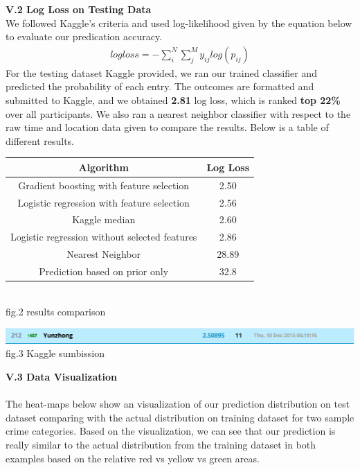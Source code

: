 \documentclass[12pt]{article}
\newenvironment{p4}[2][Part V Results and Evaluation]{\begin{trivlist}
\item[\hskip \labelsep {\bfseries #1}\hskip \labelsep {\bfseries #2}]}{\end{trivlist}}
\begin{document}
\begin{p4}{}
\item{\textbf{V.2 Log Loss on Testing Data}\\}
We followed Kaggle's criteria and used log-likelihood given by the equation below to evaluate our predication accuracy.
\begin{align*}
	logloss = -\sum_i^N \sum_j^M y_{ij} log (p_{ij})
\end{align*}
For the testing dataset Kaggle provided, we ran our trained classifier and predicted the probability of each entry. The outcomes are formatted and submitted to Kaggle, and we obtained \textbf{2.81} log loss, which is ranked \textbf{top 22\%} over all participants. We also ran a nearest neighbor classifier with respect to the raw time and location data given to compare the results. Below is a table of different results.
\begin{center}
	\begin{tabular}{||c c||} 
		\hline
	   	Algorithm & Log Loss \\
		\hline
	   	Gradient boosting with feature selection & 2.50\\
		\hline
		Logistic regression with feature selection & 2.56 \\
		\hline
		Kaggle median & 2.60\\
		\hline
		Logistic regression without selected features& 2.86 \\
		\hline
		Nearest Neighbor & 28.89 \\
		\hline
		Prediction based on prior only & 32.8 \\
		\hline
	\end{tabular}
	{\\fig.2 results comparison}\\
\end{center}
\begin{center}
	\includegraphics[width=16cm]{kaggle_result.png} 
	{\\fig.3 Kaggle sumbission}\\
\end{center}
\item{\textbf{V.3 Data Visualization}\\}
\\ 
The heat-maps below show an visualization of  our prediction distribution on test dataset comparing with the actual distribution on training dataset for two sample crime categories. Based on the visualization, we can see that our prediction is really similar to the actual distribution from the training dataset in both examples based on the relative red vs yellow vs green areas. \\

\end{p4}
\end{document}
